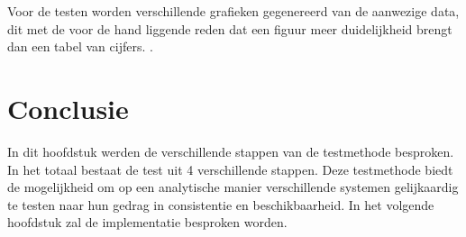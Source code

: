 Voor de testen worden verschillende grafieken gegenereerd van de aanwezige data, dit met de voor de hand liggende reden dat een figuur meer duidelijkheid brengt dan een tabel van cijfers. .  

\section{Conclusie}
In dit hoofdstuk werden de verschillende stappen van de testmethode besproken. In het totaal bestaat de test uit 4 verschillende stappen. 
Deze testmethode biedt de mogelijkheid om op een analytische manier verschillende systemen gelijkaardig te testen naar hun gedrag in consistentie en beschikbaarheid. In het volgende hoofdstuk zal de implementatie besproken worden. 
